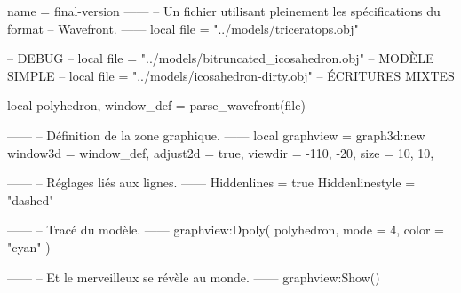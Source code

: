 \documentclass{standalone}
\begin{document}
\begin{luadraw}{name = final-version}
------
-- Un fichier utilisant pleinement les spécifications du format
-- Wavefront.
------
local file = "../models/triceratops.obj"

-- DEBUG
-- local file = "../models/bitruncated_icosahedron.obj" -- MODÈLE SIMPLE
-- local file = "../models/icosahedron-dirty.obj" -- ÉCRITURES MIXTES

local polyhedron, window_def = parse_wavefront(file)

------
-- Définition de la zone graphique.
------
local graphview = graph3d:new{
  window3d = window_def,
  adjust2d = true,
  viewdir  = {-110, -20},
  size     = {10, 10},
}

------
-- Réglages liés aux lignes.
------
Hiddenlines     = true
Hiddenlinestyle = "dashed"

------
-- Tracé du modèle.
------
graphview:Dpoly(
  polyhedron,
  {
    mode  = 4,
    color = "cyan"
  })

------
-- Et le merveilleux se révèle au monde.
------
graphview:Show()
\end{luadraw}
\end{document}
